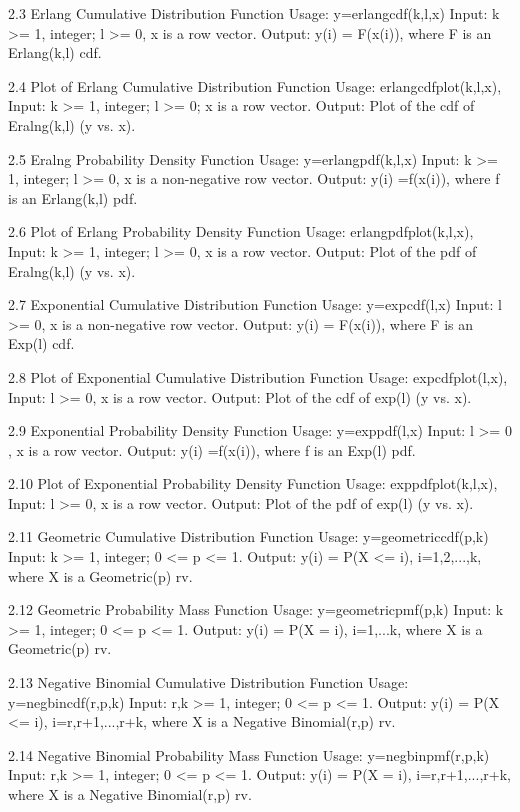 2.3 Erlang Cumulative Distribution Function
Usage:  y=erlangcdf(k,l,x)
Input: k >= 1, integer; l >= 0, x is a row vector.
Output: y(i) =  F(x(i)), where F is an Erlang(k,l) cdf. 

2.4 Plot of Erlang Cumulative Distribution Function
Usage:  erlangcdfplot(k,l,x),
Input: k >= 1, integer; l >= 0; x is a row vector.
Output: Plot of the cdf of Eralng(k,l) (y vs. x).
 
2.5 Eralng Probability Density Function
Usage:  y=erlangpdf(k,l,x)
Input: k >= 1, integer; l >= 0, x is a non-negative row vector.
Output: y(i) =f(x(i)), where f is an Erlang(k,l) pdf.

2.6 Plot of Erlang Probability Density Function
Usage:  erlangpdfplot(k,l,x),
Input: k >= 1, integer; l >= 0, x is a row vector.
Output: Plot of the pdf of Eralng(k,l) (y vs. x).

2.7 Exponential Cumulative Distribution Function
Usage:  y=expcdf(l,x)
Input: l >= 0, x is a non-negative row vector.
Output: y(i) =  F(x(i)), where F is an Exp(l) cdf. 

2.8 Plot of Exponential Cumulative Distribution Function
Usage:  expcdfplot(l,x),
Input: l >= 0, x is a row vector.
Output: Plot of the cdf of exp(l) (y vs. x). 

2.9 Exponential Probability Density Function
Usage:  y=exppdf(l,x)
Input:  l >= 0 , x is a row vector.
Output: y(i) =f(x(i)), where f is an Exp(l) pdf.

2.10 Plot of Exponential Probability Density Function
Usage:  exppdfplot(k,l,x),
Input: l >= 0, x is a row vector.
Output: Plot of the pdf of exp(l) (y vs. x). 

2.11 Geometric Cumulative Distribution Function
Usage:  y=geometriccdf(p,k)
Input: k >= 1, integer; 0 <= p <= 1.
Output: y(i) = P(X <= i),  i=1,2,...,k, where X  is a Geometric(p) rv.

2.12 Geometric Probability Mass Function
Usage:  y=geometricpmf(p,k)
Input: k >= 1, integer; 0 <= p <= 1.
Output: y(i) = P(X = i),  i=1,...k, where X is a  Geometric(p) rv.

2.13 Negative Binomial Cumulative Distribution Function
Usage:  y=negbincdf(r,p,k)
Input: r,k >= 1, integer; 0 <= p <= 1.
Output: y(i) = P(X <= i),  i=r,r+1,...,r+k, where X  is a Negative Binomial(r,p) rv.

2.14 Negative Binomial Probability Mass Function
Usage:  y=negbinpmf(r,p,k)
Input: r,k >= 1, integer; 0 <= p <= 1.
Output: y(i) = P(X = i),  i=r,r+1,...,r+k, where X  is a  Negative Binomial(r,p) rv.

